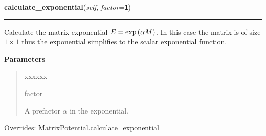 \hspace{.8\funcindent}\begin{boxedminipage}{\funcwidth}

    \raggedright \textbf{calculate\_exponential}(\textit{self}, \textit{factor}={\tt 1})

    \vspace{-1.5ex}

    \rule{\textwidth}{0.5\fboxrule}
\setlength{\parskip}{2ex}
    Calculate the matrix exponential $E =
    \exp\left( \alpha M \right)$. In this case the
    matrix is of size $1 \times 1$ thus the exponential simplifies
    to the scalar exponential function.

\setlength{\parskip}{1ex}
      \textbf{Parameters}
      \vspace{-1ex}

      \begin{quote}
        \begin{Ventry}{xxxxxx}

          \item[factor]

          A prefactor $\alpha$ in the exponential.

        \end{Ventry}

      \end{quote}

      Overrides: MatrixPotential.calculate\_exponential

    \end{boxedminipage}

    \vspace{0.5ex}

